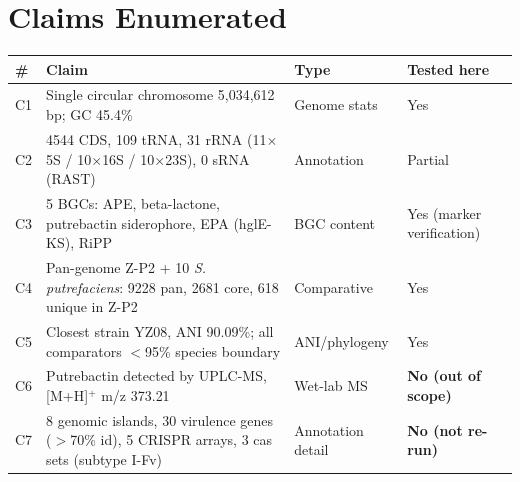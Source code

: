 \documentclass[11pt]{article}
\begin{document}
\section{Claims Enumerated}
\begin{longtable}{@{}p{}p{}p{}p{}@{}}
\toprule
\# & Claim & Type & Tested here \\ \midrule
C1 & Single circular chromosome 5{,}034{,}612 bp; GC 45.4\% & Genome stats & Yes \\
C2 & 4544 CDS, 109 tRNA, 31 rRNA (11$\times$5S / 10$\times$16S / 10$\times$23S), 0 sRNA (RAST) & Annotation & Partial \\
C3 & 5 BGCs: APE, beta-lactone, putrebactin siderophore, EPA (hglE-KS), RiPP & BGC content & Yes (marker verification) \\
C4 & Pan-genome Z-P2 + 10 \emph{S. putrefaciens}: 9228 pan, 2681 core, 618 unique in Z-P2 & Comparative & Yes \\
C5 & Closest strain YZ08, ANI 90.09\%; all comparators $<$95\% species boundary & ANI/phylogeny & Yes \\
C6 & Putrebactin detected by UPLC-MS, [M+H]$^{+}$ m/z 373.21 & Wet-lab MS & \textbf{No (out of scope)} \\
C7 & 8 genomic islands, 30 virulence genes ($>$70\% id), 5 CRISPR arrays, 3 cas sets (subtype I-Fv) & Annotation detail & \textbf{No (not re-run)} \\
\bottomrule
\end{longtable}
\end{document}
